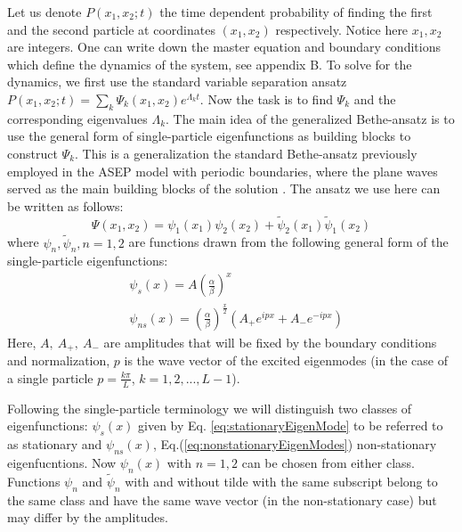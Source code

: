 \documentclass[aps,showpacs,twocolumn,floatfix,prx,superscriptaddress]{revtex4-1}
\begin{document}
Let us denote $P(x_1, x_2; t)$ the time dependent probability of finding the first and the second particle at coordinates $(x_1, x_2)$ respectively. Notice here $x_1, x_2$ are integers. One can write down the master equation and boundary conditions which define the dynamics of the system, see appendix B. To solve for the dynamics, we first use the standard variable separation ansatz $P(x_1, x_2; t) = \sum_k { \Psi_k(x_1, x_2) e^{\Lambda_k t}}$. Now the task is to find $\Psi_k$ and the corresponding eigenvalues $\Lambda_k$. The main idea of the generalized Bethe-ansatz is to use the general form of single-particle eigenfunctions as building blocks to construct $\Psi_k$. This is a generalization the standard Bethe-ansatz previously employed in the ASEP model with periodic boundaries, where the plane waves served as the main building blocks of the solution \cite{}. The ansatz we use here can be written as follows:
\begin{equation}
    \label{eq:ansatzTwo}
    \Psi(x_1, x_2) = \psi_1(x_1)\psi_2(x_2) + \tilde{\psi}_2(x_1)\tilde{\psi}_1(x_2)
\end{equation}
where $\psi_n, \tilde{\psi}_n, n=1,2$ are functions drawn from the following general form of the single-particle eigenfunctions:
\begin{subequations}
    \label{eq:eigenModes}
\begin{eqnarray}
    \label{eq:stationaryEigenMode}
    &\psi_s(x)  =  A\left(\frac{\alpha}{\beta}\right)^x \\
    \label{eq:nonstationaryEigenModes}
    &\psi_{ns}(x)  =  \left(\frac{\alpha}{\beta}\right)^{\frac{x}{2}}
    \left(A_+ e^{ipx} +  A_-e^{-ipx}\right) 
\end{eqnarray}
\end{subequations}
Here, $A,~A_+,~A_-$ are amplitudes that will be fixed by the boundary conditions and normalization, $p$ is the wave vector of the excited eigenmodes (in the case of a single particle $p=\frac{k\pi}{L}$, $k=1,2,...,L-1$).

Following the single-particle terminology we will distinguish two classes of eigenfunctions: $\psi_s(x)$ given by Eq. \eqref{eq:stationaryEigenMode} to be referred to as stationary and $\psi_{ns}(x)$, Eq.(\ref{eq:nonstationaryEigenModes}) non-stationary eigenfucntions. Now $\psi_n(x)$ with $n=1,2$ can be chosen from either class. Functions $\psi_n$ and  $\tilde{\psi}_n$  with and without tilde with the same subscript belong to the same class and have the same wave vector (in the non-stationary case) but may differ by the amplitudes. %
\end{document}
